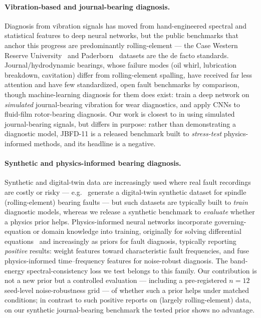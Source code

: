 \documentclass{article}
\begin{document}
\paragraph{Vibration-based and journal-bearing diagnosis.}
Diagnosis from vibration signals has moved from hand-engineered spectral and
statistical features to deep neural networks, but the public benchmarks that
anchor this progress are predominantly rolling-element --- the Case Western
Reserve University~\citep{smith2015cwru} and Paderborn~\citep{lessmeier2016paderborn}
datasets are the de facto standards. Journal/hydrodynamic bearings, whose failure
modes (oil whirl, lubrication breakdown, cavitation) differ from rolling-element
spalling, have received far less attention and have few standardized, open fault
benchmarks by comparison, though machine-learning diagnosis for them does exist:
\citet{gecgel2021journalbearing} train a deep network on \emph{simulated}
journal-bearing vibration for wear diagnostics, and \citet{jeon2020fluidfilm}
apply CNNs to fluid-film rotor-bearing diagnosis. Our work is closest to
\citet{gecgel2021journalbearing} in using simulated journal-bearing signals, but
differs in purpose: rather than demonstrating a diagnostic model, JBFD-11 is a
released benchmark built to \emph{stress-test} physics-informed methods, and its
headline is a negative.

\paragraph{Synthetic and physics-informed bearing diagnosis.}
Synthetic and digital-twin data are increasingly used where real fault recordings
are costly or risky --- e.g.\ \citet{zeynivand2026digitaltwin} generate a
digital-twin synthetic dataset for spindle (rolling-element) bearing faults ---
but such datasets are typically built to \emph{train} diagnostic models, whereas
we release a synthetic benchmark to \emph{evaluate} whether a physics prior
helps. Physics-informed neural networks incorporate governing-equation or domain
knowledge into training, originally for solving differential
equations~\citep{raissi2019pinn} and increasingly as priors for fault diagnosis,
typically reporting \emph{positive} results: \citet{lu2023physicsinformed} weight
features toward characteristic fault frequencies, and \citet{kim2024physicsinformed}
fuse physics-informed time--frequency features for noise-robust diagnosis. The
band-energy spectral-consistency loss we test belongs to this family. Our
contribution is not a new prior but a controlled evaluation --- including a
pre-registered $n{=}12$ seed-level noise-robustness grid --- of whether such a
prior helps under matched conditions; in contrast to such positive reports on
(largely rolling-element) data, on our synthetic journal-bearing benchmark the
tested prior shows no advantage.
\end{document}
